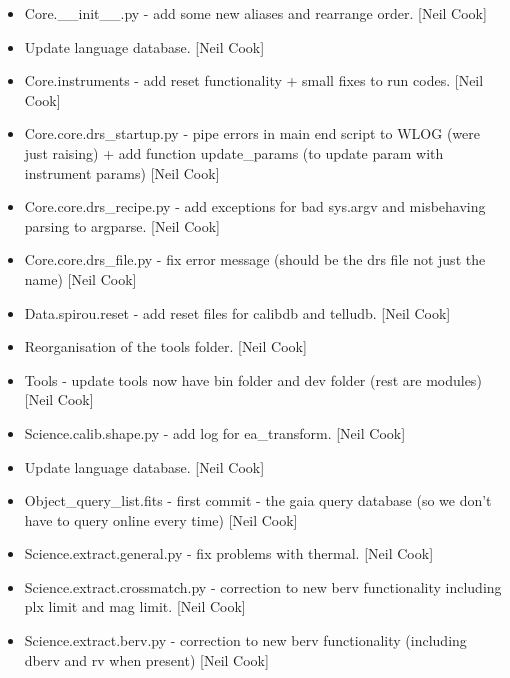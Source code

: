 \documentclass[a4paper,10pt,english]{report}
\begin{document}
\begin{itemize}
\item {} 
Core.\_\_init\_\_.py - add some new aliases and rearrange order. {[}Neil
Cook{]}

\item {} 
Update language database. {[}Neil Cook{]}

\item {} 
Core.instruments - add reset functionality + small fixes to run codes.
{[}Neil Cook{]}

\item {} 
Core.core.drs\_startup.py - pipe errors in main end script to WLOG
(were just raising) + add function update\_params (to update param with
instrument params) {[}Neil Cook{]}

\item {} 
Core.core.drs\_recipe.py - add exceptions for bad sys.argv and
misbehaving parsing to argparse. {[}Neil Cook{]}

\item {} 
Core.core.drs\_file.py - fix error message (should be the drs file not
just the name) {[}Neil Cook{]}

\item {} 
Data.spirou.reset - add reset files for calibdb and telludb. {[}Neil
Cook{]}

\item {} 
Reorganisation of the tools folder. {[}Neil Cook{]}

\item {} 
Tools - update tools now have bin folder and dev folder (rest are
modules) {[}Neil Cook{]}

\item {} 
Science.calib.shape.py - add log for ea\_transform. {[}Neil Cook{]}

\item {} 
Update language database. {[}Neil Cook{]}

\item {} 
Object\_query\_list.fits - first commit - the gaia query database (so we
don’t have to query online every time) {[}Neil Cook{]}

\item {} 
Science.extract.general.py - fix problems with thermal. {[}Neil Cook{]}

\item {} 
Science.extract.crossmatch.py - correction to new berv functionality
including plx limit and mag limit. {[}Neil Cook{]}

\item {} 
Science.extract.berv.py - correction to new berv functionality
(including dberv and rv when present) {[}Neil Cook{]}


\end{itemize}
\end{document}
